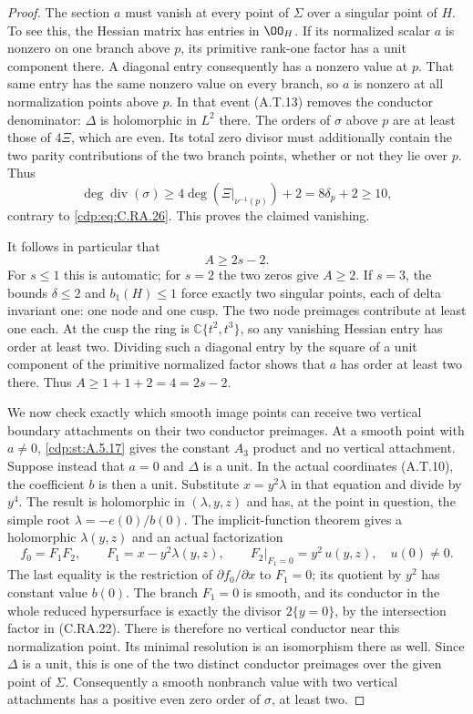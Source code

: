 \begin{proof}
The section $a$ must vanish at every point of $\Sigma$
over a singular point of $H$. To see this, the Hessian
matrix has entries in $\OO_H$. If its normalized scalar
$a$ is nonzero on one branch above $p$, its primitive
rank-one factor has a unit component there. A diagonal
entry consequently has a nonzero value at $p$. That
same entry has the same nonzero value on every branch,
so $a$ is nonzero at all normalization points above $p$.
In that event (A.T.13) removes the conductor denominator:
$\Delta$ is holomorphic in $L^2$ there. The orders of
$\sigma$ above $p$ are at least those of $4\Xi$,
which are even. Its total zero divisor must additionally
contain the two parity contributions of the two branch
points, whether or not they lie over $p$. Thus
\[
 \deg\operatorname{div}(\sigma)
       \ge4\deg(\Xi|_{\nu^{-1}(p)})+2
       =8\delta_p+2\ge10,
\tag{C.RA.27}\label{cdp:eq:C.RA.27}
\]
contrary to \eqref{cdp:eq:C.RA.26}. This proves the claimed vanishing.

It follows in particular that
\[
                              A\ge2s-2.
\tag{C.RA.28}\label{cdp:eq:C.RA.28}
\]
For $s\le1$ this is automatic; for $s=2$ the two
zeros give $A\ge2$. If $s=3$, the bounds
$\delta\le2$ and $b_1(H)\le1$ force exactly two
singular points, each of delta invariant one: one node
and one cusp. The two node preimages contribute at
least one each. At the cusp the ring is
$\mathbb C\{t^2,t^3\}$, so any vanishing Hessian entry
has order at least two. Dividing such a diagonal entry
by the square of a unit component of the primitive
normalized factor shows that $a$ has order at least
two there. Thus $A\ge1+1+2=4=2s-2$.

We now check exactly which smooth image points can
receive two vertical boundary attachments on their two
conductor preimages. At a smooth point with $a\ne0$,
\ref{cdp:st:A.5.17} gives the constant $A_3$ product and no vertical
attachment. Suppose instead that $a=0$ and $\Delta$
is a unit. In the actual coordinates (A.T.10), the
coefficient $b$ is then a unit. Substitute $x=y^2\lambda$
in that equation and divide by $y^4$. The result is
holomorphic in $(\lambda,y,z)$ and has, at the point
in question, the simple root
$\lambda=-e(0)/b(0)$. The implicit-function theorem
gives a holomorphic $\lambda(y,z)$ and an actual
factorization
\[
 f_0=F_1F_2,\qquad
 F_1=x-y^2\lambda(y,z),\qquad
 F_2|_{F_1=0}=y^2\,u(y,z),\quad u(0)\ne0.
\tag{C.RA.29}\label{cdp:eq:C.RA.29}
\]
The last equality is the restriction of
$\partial f_0/\partial x$ to $F_1=0$; its quotient
by $y^2$ has constant value $b(0)$.
The branch $F_1=0$ is smooth, and its conductor in the
whole reduced hypersurface is exactly the divisor
$2\{y=0\}$, by the intersection factor in
(C.RA.22). There is therefore no vertical conductor
near this normalization point. Its minimal resolution
is an isomorphism there as well. Since $\Delta$ is a
unit, this is one of the two distinct conductor
preimages over the given point of $\Sigma$.
Consequently a smooth nonbranch value with two vertical
attachments has a positive even zero order of $\sigma$,
at least two.


\end{proof}
